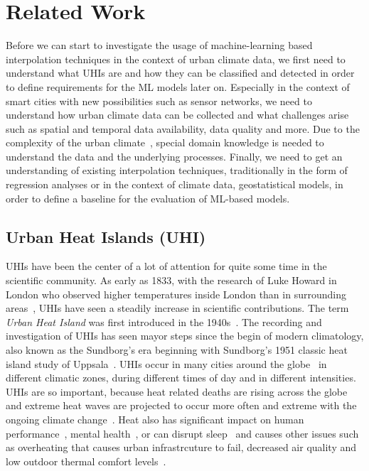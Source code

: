 \chapter{Related Work}
\label{chap:Related Work}

Before we can start to investigate the usage of machine-learning based interpolation techniques in the context of urban climate data, we first need to understand what UHIs are and how they can be classified and detected in order to define requirements for the ML models later on. Especially in the context of smart cities with new possibilities such as sensor networks, we need to understand how urban climate data can be collected and what challenges arise such as spatial and temporal data availability, data quality and more. Due to the complexity of the urban climate~\cite{oke2006guideline}, special domain knowledge is needed to understand the data and the underlying processes.
Finally, we need to get an understanding of existing interpolation techniques, traditionally in the form of regression analyses or in the context of climate data, geostatistical models, in order to define a baseline for the evaluation of ML-based models.

\section{Urban Heat Islands (UHI)}

UHIs have been the center of a lot of attention for quite some time in the scientific community. As early as 1833, with the research of Luke Howard in London who observed higher temperatures inside London than in surrounding areas~\cite{howard1833climate}, UHIs have seen a steadily increase in scientific contributions. The term \textit{Urban Heat Island} was first introduced in the 1940s~\cite{balchin1947micro}. The recording and investigation of UHIs has seen mayor steps since the begin of modern climatology, also known as the Sundborg's era beginning with Sundborg's 1951 classic heat island study of Uppsala~\cite{sundborg1951climatological}. UHIs occur in many cities around the globe~\cite{peng2012surface} in different climatic zones, during different times of day and in different intensities.\\
UHIs are so important, because heat related deaths are rising across the globe~\cite{kovats2008heat} and extreme heat waves are projected to occur more often and extreme with the ongoing climate change~\cite{lorenz2019detection}. Heat also has significant impact on human performance~\cite{kjellstrom2016heat}, mental health~\cite{obradovich2018empirical}, or can disrupt sleep~\cite{obradovich2017nighttime} and causes other issues such as overheating that causes urban infrastrcuture to fail, decreased air quality and low outdoor thermal comfort levels~\cite{stone2013climate}.

